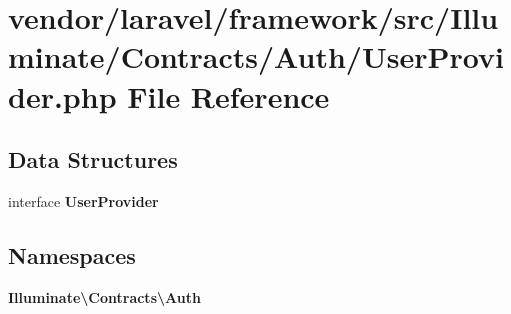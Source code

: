 \section{vendor/laravel/framework/src/\+Illuminate/\+Contracts/\+Auth/\+User\+Provider.php File Reference}
\label{_user_provider_8php}
\subsection*{Data Structures}
\begin{DoxyCompactItemize}
\item 
interface {\bf User\+Provider}
\end{DoxyCompactItemize}
\subsection*{Namespaces}
\begin{DoxyCompactItemize}
\item 
 {\bf Illuminate\textbackslash{}\+Contracts\textbackslash{}\+Auth}
\end{DoxyCompactItemize}
